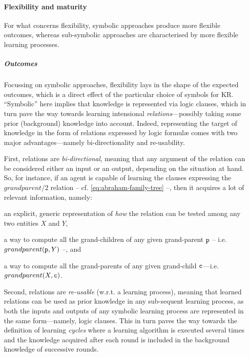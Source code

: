 \documentclass[12pt,a4paper,openright,twoside]{book}
\begin{document}
\paragraph{Flexibility and maturity}

For what concerns flexibility, symbolic approaches produce more flexible outcomes, whereas sub-symbolic approaches are characterised by more flexible learning processes.

\subparagraph{Outcomes}

Focussing on symbolic approaches, flexibility lays in the shape of the expected outcomes, which is a direct effect of the particular choice of symbols for KR.
%
``Symbolic'' here implies that knowledge is represented via logic clauses, which in turn pave the way towards learning intensional \emph{relations}---possibly taking some prior (background) knowledge into account.
%
Indeed, representing the target of knowledge in the form of relations expressed by logic formul\ae{} comes with two major advantages---namely bi-directionality and re-usability.

First, relations are \emph{bi-directional}, meaning that any argument of the relation can be considered either an input or an output, depending on the situation at hand.
%
So, for instance, if an agent is capable of learning the clauses expressing the $grandparent/2$ relation -- cf. \cref{eq:abraham-family-tree} --, then it acquires a lot of relevant information, namely:
%
\begin{inlinelist}
    \item an explicit, generic representation of \emph{how} the relation can be tested among any two entities $X$ and $Y$,
    \item a way to compute all the grand-children of any given grand-parent $\mathtt{p}$ -- i.e. $grandparent(\mathtt{p}, Y)$ --, and
    \item a way to compute all the grand-parents of any given grand-child $\mathtt{c}$---i.e. $grandparent(X, \mathtt{c})$.
\end{inlinelist}

Second, relations are \emph{re-usable} (w.r.t. a learning process), meaning that learned relations can be used as prior knowledge in any sub-sequent learning process, as both the inputs and outputs of any symbolic learning process are represented in the same form---namely, logic clauses.
%
This in turn paves the way towards the definition of learning \emph{cycles} where a learning algorithm is executed several times and the knowledge acquired after each round is included in the background knowledge of successive rounds.
\end{document}

